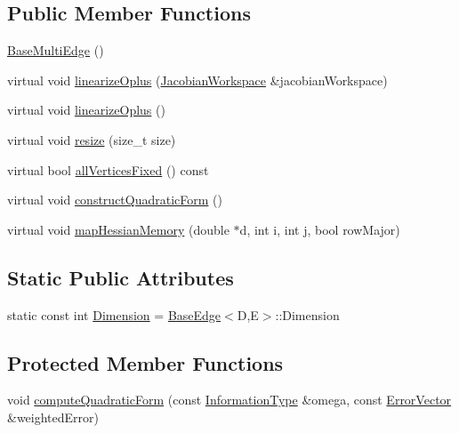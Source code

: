 \subsection*{Public Member Functions}
\begin{DoxyCompactItemize}
\item 
\hyperlink{classg2o_1_1BaseMultiEdge_a761d6a3623ed2c4ce6c6535f78dac08d}{Base\+Multi\+Edge} ()
\item 
virtual void \hyperlink{classg2o_1_1BaseMultiEdge_a72176776797987b8ae79ea2e33971e9e}{linearize\+Oplus} (\hyperlink{classg2o_1_1JacobianWorkspace}{Jacobian\+Workspace} \&jacobian\+Workspace)
\item 
virtual void \hyperlink{classg2o_1_1BaseMultiEdge_a6196a4cd1ddc2ef27c1474252bb60e9f}{linearize\+Oplus} ()
\item 
virtual void \hyperlink{classg2o_1_1BaseMultiEdge_ae07ec9359cd515d0abc2100ee8aae93f}{resize} (size\+\_\+t size)
\item 
virtual bool \hyperlink{classg2o_1_1BaseMultiEdge_a0873441402f991c0cfbe92a6ab718daa}{all\+Vertices\+Fixed} () const 
\item 
virtual void \hyperlink{classg2o_1_1BaseMultiEdge_ae44ba0385d4dda4bc038d81e50cadd8c}{construct\+Quadratic\+Form} ()
\item 
virtual void \hyperlink{classg2o_1_1BaseMultiEdge_aecded66022b967fab0deb1c6a2d76445}{map\+Hessian\+Memory} (double $\ast$d, int i, int j, bool row\+Major)
\end{DoxyCompactItemize}
\subsection*{Static Public Attributes}
\begin{DoxyCompactItemize}
\item 
static const int \hyperlink{classg2o_1_1BaseMultiEdge_a3c713fe8d1cd161f777625d8e2d5695d}{Dimension} = \hyperlink{classg2o_1_1BaseEdge}{Base\+Edge}$<$D,E$>$\+::Dimension
\end{DoxyCompactItemize}
\subsection*{Protected Member Functions}
\begin{DoxyCompactItemize}
\item 
void \hyperlink{classg2o_1_1BaseMultiEdge_ac260b65c12f6594165af680f815ac291}{compute\+Quadratic\+Form} (const \hyperlink{classg2o_1_1BaseEdge_a2e5a33343ac3f189d8a7d5ee4d8b73fc}{Information\+Type} \&omega, const \hyperlink{classg2o_1_1BaseEdge_af5b558dd24e4be2e437563cae4b3550d}{Error\+Vector} \&weighted\+Error)
\end{DoxyCompactItemize}
